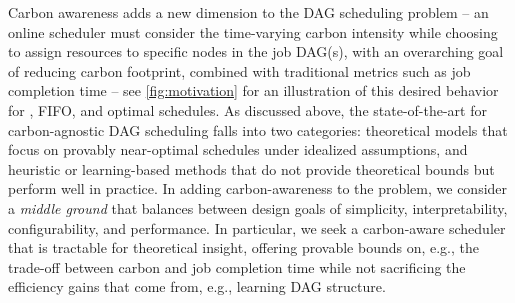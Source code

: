 Carbon awareness adds a new dimension to the DAG scheduling problem -- an online scheduler must consider the time-varying carbon intensity while choosing to assign resources to specific nodes in the job DAG(s), with an overarching goal of reducing carbon footprint, combined with traditional metrics such as job completion time -- see \autoref{fig:motivation} for an illustration of this desired behavior for \DANISH, FIFO, and optimal schedules.
As discussed above, the state-of-the-art for carbon-agnostic DAG scheduling falls into two categories: theoretical models that focus on provably near-optimal schedules under idealized assumptions, and heuristic or learning-based methods that do not provide theoretical bounds but perform well in practice.
In adding carbon-awareness to the problem, we consider a \textit{middle ground} that balances between design goals of simplicity, interpretability, configurability, and performance. 
In particular, we seek a carbon-aware scheduler that is tractable for theoretical insight, offering provable bounds on, e.g., the trade-off between carbon and job completion time while not sacrificing the efficiency gains that come from, e.g., learning DAG structure.